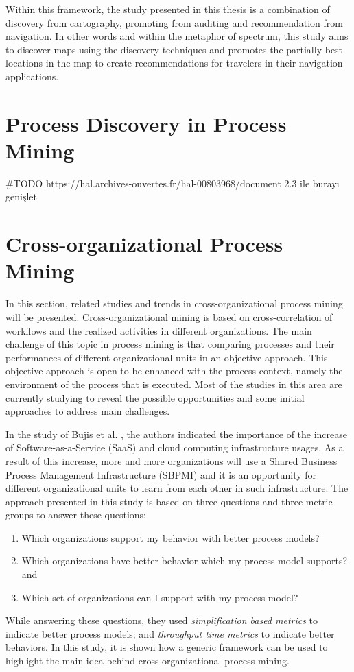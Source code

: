 Within this framework, the study presented in this thesis is a combination of discovery from cartography, promoting from auditing and recommendation from navigation. In other words and within the metaphor of spectrum, this study aims to discover maps using the discovery techniques and promotes the partially best locations in the map to create recommendations for travelers in their navigation applications. 

\section{Process Discovery in Process Mining}
\label{sec:process-discovery-in-process-mining}    
#TODO https://hal.archives-ouvertes.fr/hal-00803968/document 2.3 ile burayı genişlet

\section{Cross-organizational Process Mining}
\label{sec:cross-organizational-process-mining}
In this section, related studies and trends in cross-organizational process mining will be presented. Cross-organizational mining is based on cross-correlation of workflows and the realized activities in different organizations. The main challenge of this topic in process mining is that comparing processes and their performances of different organizational units in an objective approach. This objective approach is open to be enhanced with the process context, namely the environment of the process that is executed. Most of the studies in this area are currently studying to reveal the possible opportunities and some initial approaches to address main challenges.

In the study of Bujis et al. \cite{buijs2012towards}, the authors indicated the importance of the increase of Software-as-a-Service (SaaS) and cloud computing infrastructure usages. As a result of this increase, more and more organizations will use a Shared Business Process Management Infrastructure (SBPMI) and it is an opportunity for different organizational units to learn from each other in such infrastructure. The approach presented in this study is based on three questions and three metric groups to answer these questions:
\begin{enumerate}
\item Which organizations support my behavior with better process models?
\item Which organizations have better behavior which my process model supports? and
\item Which set of organizations can I support with my process model?
\end{enumerate} While answering these questions, they used \textit{simplification based metrics} to indicate better process models; and \textit{throughput time metrics} to indicate better behaviors. In this study, it is shown how a generic framework can be used to highlight the main idea behind cross-organizational process mining. 


